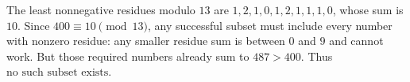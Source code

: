 The least nonnegative residues modulo $13$ are $1,2,1,0,1,2,1,1,1,0$, whose sum is $10$. Since $400\equiv10\pmod{13}$, any successful subset must include every number with nonzero residue: any smaller residue sum is between $0$ and $9$ and cannot work. But those required numbers already sum to $487>400$. Thus $\boxed{\text{no such subset exists}}$.
